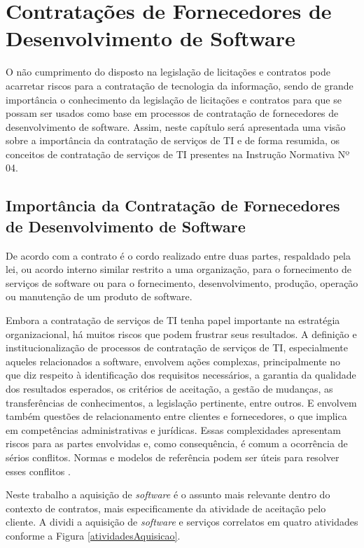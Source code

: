 \chapter{Contratações de Fornecedores de Desenvolvimento de Software}
\label{chap:contratos}

O não cumprimento do disposto na legislação de licitações e contratos pode acarretar riscos para a contratação de tecnologia da informação, sendo de grande importância o conhecimento da legislação de licitações e contratos para que se possam ser usados como base em processos de contratação de fornecedores de desenvolvimento de software.
Assim, neste capítulo será apresentada uma visão sobre a importância da contratação de
serviços de TI e de forma resumida, os conceitos de contratação de serviços de TI presentes na Instrução Normativa Nº 04.

\section{Importância da Contratação de Fornecedores de Desenvolvimento de Software}

De acordo com a \cite{ISO:12207} contrato é o cordo realizado entre duas partes, respaldado pela lei, ou acordo interno similar restrito a uma organização, para o fornecimento de serviços de software ou para o fornecimento, desenvolvimento, produção, operação ou manutenção de um produto de software.

Embora a contratação de serviços de TI tenha papel importante na estratégia organizacional, há muitos riscos que podem frustrar seus resultados. A definição e institucionalização de processos de contratação de serviços de TI, especialmente aqueles relacionados a software, envolvem ações complexas, principalmente no que diz respeito à identificação dos requisitos necessários, a garantia da qualidade dos resultados esperados, os critérios de aceitação, a gestão de mudanças, as transferências de conhecimentos, a legislação pertinente, entre outros. E envolvem também questões de relacionamento entre clientes e fornecedores, o que implica em competências administrativas e jurídicas. Essas complexidades apresentam riscos para as partes envolvidas e, como consequência, é comum a ocorrência de sérios conflitos. Normas e modelos de referência podem ser úteis para resolver esses conflitos \cite{processoContratacao}.

Neste trabalho a aquisição de \textit{software} é o assunto mais relevante dentro do contexto de contratos,  mais especificamente da atividade de aceitação pelo cliente. A \cite{ISO:12207} dividi a aquisição de \textit{software} e serviços correlatos em quatro atividades conforme a Figura \ref{atividadesAquisicao}.


